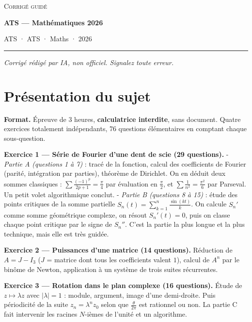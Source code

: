 \documentclass[11pt,a4paper]{article}
\begin{document}
\thispagestyle{plain}
\begin{center}
  {\small\scshape Corrigé guidé}\par\smallskip
  {\LARGE\bfseries ATS — Mathématiques 2026\par}\medskip
  {\large ATS · ATS · Maths · 2026\par}
\end{center}
\vspace{2pt}\hrule\vspace{8pt}

\emph{Corrigé rédigé par IA, non officiel. Signalez toute erreur.}

\hypertarget{pruxe9sentation-du-sujet}{%
\section{Présentation du sujet}\label{pruxe9sentation-du-sujet}}

\textbf{Format.} Épreuve de 3 heures, \textbf{calculatrice interdite}, sans document. Quatre exercices totalement indépendants, 76 questions élémentaires en comptant chaque sous-question.

\textbf{Exercice 1 --- Série de Fourier d'une dent de scie (29 questions).}
- \emph{Partie A (questions 1 à 7)} : tracé de la fonction, calcul des coefficients de Fourier (parité, intégration par parties), théorème de Dirichlet. On en déduit deux sommes classiques : \(\sum\frac{(-1)^p}{2p+1}=\frac\pi4\) par évaluation en \(\frac\pi2\), et \(\sum\frac1{n^2}=\frac{\pi^2}6\) par Parseval. Un petit volet algorithmique conclut.
- \emph{Partie B (questions 8 à 15)} : étude des points critiques de la somme partielle \(S_n(t)=\sum_{k=1}^n\frac{\sin(kt)}k\). On calcule \(S_n'\) comme somme géométrique complexe, on résout \(S_n'(t)=0\), puis on classe chaque point critique par le signe de \(S_n''\). C'est la partie la plus longue et la plus technique, mais elle est très guidée.

\textbf{Exercice 2 --- Puissances d'une matrice (14 questions).} Réduction de \(A=J-I_3\) (\(J\) = matrice dont tous les coefficients valent \(1\)), calcul de \(A^n\) par le binôme de Newton, application à un système de trois suites récurrentes.

\textbf{Exercice 3 --- Rotation dans le plan complexe (16 questions).} Étude de \(z\mapsto\lambda z\) avec \(|\lambda|=1\) : module, argument, image d'une demi-droite. Puis périodicité de la suite \(z_n=\lambda^nz_0\) selon que \(\frac\theta{2\pi}\) est rationnel ou non. La partie C fait intervenir les racines \(N\)-ièmes de l'unité et un algorithme.
\end{document}
